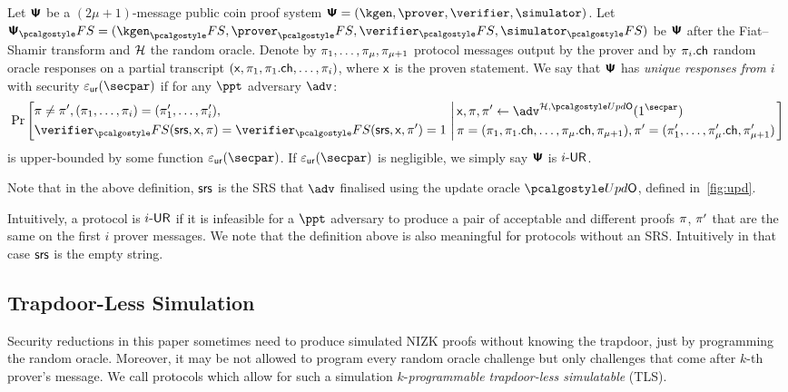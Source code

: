 \begin{definition}
	\label{def:wiuru}
	Let $\bm{\mathsf{\Psi}}$ be a $(2\mu + 1)$-message public coin proof system
  $\ps = (\kgen, \prover, \verifier, \simulator)$. Let
  $\proofsystem_\fs = (\kgen_\fs, \prover_\fs, \verifier_\fs, \simulator_\fs)$ be
  $\bm{\mathsf{\Psi}}$ after the Fiat--Shamir transform and $\mathcal{H}$ the random oracle. Denote
  by $\pi_1, \ldots, \pi_{\mu}, \pi_{\mu + 1}$ protocol messages
  output by the prover and by $\pi_i.\mathsf{ch}$ random oracle responses on a partial
  transcript
  $(\mathsf{x}, \pi_1, \pi_1.\mathsf{ch}, \ldots, \pi_i)$,
  where $\mathsf{x}$ is the proven statement. We say that $\bm{\mathsf{\Psi}}$ has \emph{unique
    responses from $i$} with security $\epsur(\secpar)$ if for any $\ppt$ adversary $\adv$:
  \[
	\Pr\left[
	\begin{aligned}
	& \zkproof \neq \zkproof', (\zkproof_1, \ldots, \zkproof_{i}) = (\zkproof'_1,
	\ldots, \zkproof'_{i}), \\
	& \verifier_\fs (\srs, \inp, \zkproof) =
	\verifier_\fs(\srs, \inp, \zkproof') = 1  \\
	\end{aligned}
	\,\left|\,
	\begin{aligned}
	& \inp, \zkproof, \zkproof'  \gets \adv^{\ro, \initU}(1^\secpar) \\
& \zkproof = (\zkproof_1, \zkproof_1.\ch, \ldots, \zkproof_{\mu}.\ch, \zkproof_{\mu + 1}), \zkproof' = (\zkproof'_1, \ldots,
	\zkproof'_{\mu}.\ch, \zkproof'_{\mu + 1})
	\end{aligned}
	\right.\right]
	\]
	is upper-bounded by some function $\epsur(\secpar)$. If $\epsur(\secpar)$ is negligible, we simply say $\bm{\mathsf{\Psi}}$ is ${i\text{-}\mathsf{UR}}$.
\end{definition}
%
Note that in the above definition, $\mathsf{srs}$ is the SRS that $\advse$ finalised using
the update oracle $\initU$, defined in~\cref{fig:upd}.

Intuitively, a protocol is ${i\text{-}\mathsf{UR}}$ if it is infeasible for a $\ppt$ adversary to
produce a pair of acceptable and different proofs $\pi$, $\pi'$ that are
the same on the first $i$ prover messages.  We note that the definition above is also
meaningful for protocols without an SRS. Intuitively in that case $\mathsf{srs}$ is the empty
string.

 \subsection{Trapdoor-Less Simulation}
 Security reductions in this paper sometimes need to produce simulated NIZK proofs without
 knowing the trapdoor, just by programming the random oracle. Moreover, it may be not allowed to program every random oracle challenge but only challenges that come after $k$-th prover's message. We call protocols which allow for such a simulation $k$-\emph{programmable trapdoor-less simulatable} (TLS).

